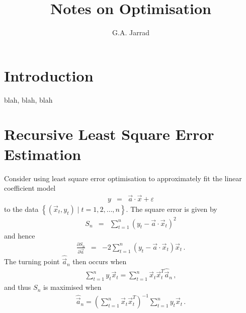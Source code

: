 \documentclass[a4paper]{article}
\title{Notes on Optimisation}
\author{G.A. Jarrad}
\begin{document}
\maketitle
{}
\section{Introduction}\label{sec:intro}
blah, blah, blah

\section{Recursive Least Square Error Estimation}
Consider using least square error optimisation to approximately fit the linear coefficient model
\begin{eqnarray}
   y & = & \vec{a}\cdot\vec{x}+\varepsilon
\label{eq:y_ax}
\end{eqnarray}
to the data $\left\{(\vec{x}_t,y_t)\;|\;t=1,2,\ldots,n\right\}$.
The square error is given by
\begin{eqnarray}
   S_n & = & \sum_{t=1}^n(y_t-\vec{a}\cdot\vec{x}_t)^2
\end{eqnarray}
and hence
\begin{eqnarray}
   \frac{\partial S_n}{\partial\vec{a}} & = & -2\sum_{t=1}^n(y_t-\vec{a}\cdot\vec{x}_t)\vec{x}_t\,.
\end{eqnarray}
The turning point $\hat{\vec{a}}_n$ then occurs when
\begin{eqnarray}
   \sum_{t=1}^n y_t\vec{x}_t = \sum_{t=1}^n\vec{x}_t\vec{x}_t^{T}\hat{\vec{a}}_n\,,
\label{eq:yx_xxa_n}
\end{eqnarray}
and thus $S_n$ is maximised when
\begin{eqnarray}
   \hat{\vec{a}}_n = \left(\sum_{t=1}^n\vec{x}_t\vec{x}_t^{T}\right)^{-1}\sum_{t=1}^n y_t\vec{x}_t\,.
\end{eqnarray}
\end{document}
